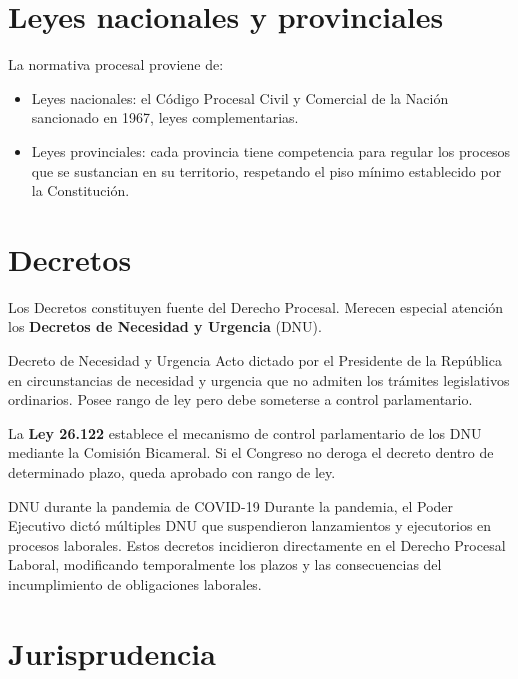 \documentclass[12pt,oneside]{book}
\begin{document}
\section{Leyes nacionales y provinciales}

La normativa procesal proviene de:

\begin{itemize}
    \item Leyes nacionales: el Código Procesal Civil y Comercial de la Nación sancionado en 1967, leyes complementarias.
    \item Leyes provinciales: cada provincia tiene competencia para regular los procesos que se sustancian en su territorio, respetando el piso mínimo establecido por la Constitución.
\end{itemize}

\section{Decretos}

Los Decretos constituyen fuente del Derecho Procesal. Merecen especial atención los \textbf{Decretos de Necesidad y Urgencia} (DNU).

\begin{definition}{Decreto de Necesidad y Urgencia}
Acto dictado por el Presidente de la República en circunstancias de necesidad y urgencia que no admiten los trámites legislativos ordinarios. Posee rango de ley pero debe someterse a control parlamentario.
\end{definition}

La \textbf{Ley 26.122} establece el mecanismo de control parlamentario de los DNU mediante la Comisión Bicameral. Si el Congreso no deroga el decreto dentro de determinado plazo, queda aprobado con rango de ley.

\begin{example}{DNU durante la pandemia de COVID-19}
Durante la pandemia, el Poder Ejecutivo dictó múltiples DNU que suspendieron lanzamientos y ejecutorios en procesos laborales. Estos decretos incidieron directamente en el Derecho Procesal Laboral, modificando temporalmente los plazos y las consecuencias del incumplimiento de obligaciones laborales.
\end{example}

\section{Jurisprudencia}
\end{document}
